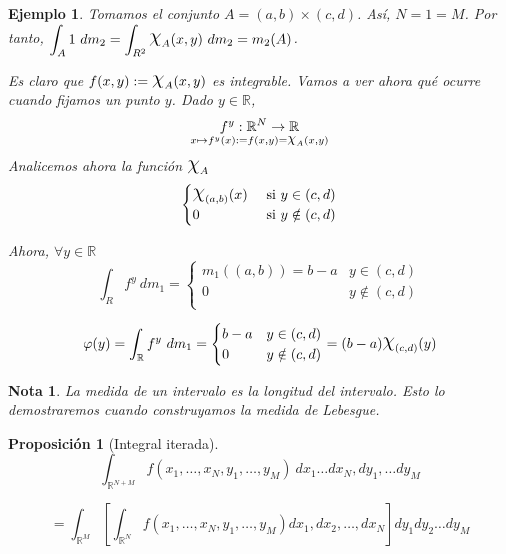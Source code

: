 \documentclass[11pt, a4paper]{article}
\newif\IfInSansMode
\newcommand{\R}{\mathbb{R}} \newcommand{\N}{\mathbb{N}}
\DeclareRobustCommand{\rchi}{{\Large \mathpalette\irchi\relax}}
\newcommand{\irchi}[2]{\raisebox{0.4\depth}{$#1\chi$}} %
\theoremstyle{theorem-style}
\newtheorem{nprop}{Proposición}[section]
\theoremstyle{definition-style}
\theoremstyle{remark-style}
\newtheorem*{nota}{Nota}
\theoremstyle{example-style}
\newtheorem{ejemplo}{Ejemplo}[section]
\begin{document}
\begin{ejemplo}
  Tomamos el conjunto $A = (a, b) \times (c, d)$. Así, $N = 1 = M$. Por tanto,
  $\displaystyle \int_A 1 \ dm_2 = \int_{R^2} \rchi_A (x, y) \ dm_2 = m_2(A)$.

  Es claro que $f(x, y) := \rchi_A(x,y)$ es integrable. Vamos a ver ahora qué
  ocurre cuando fijamos un punto $y$. Dado $y \in \R$, $$\underset{x \mapsto f^y(x)
      := f(x, y) = \rchi_A(x,y)}{f^y: \R^N \rightarrow \R}$$
  Analicemos ahora la función $\rchi_A$
  $$\begin{cases}
    \rchi_{(a,b)}(x) & \text{ si } y \in (c,d) \\
    0 & \text{ si } y \notin (c,d) \\
  \end{cases}$$

  Ahora, $\forall y \in \R$ $$\int_R f^y \ dm_1 = \begin{cases}
    m_1 ((a,b)) = b - a & y \in (c, d) \\
    0 & y \notin (c, d) \\
  \end{cases}$$

  \[\varphi(y) = \int_{\R} f^y \ dm_1 = \begin{cases}
    b - a & y \in (c, d) \\
    0 & y \notin (c, d) \\
  \end{cases} = (b -a) \rchi_{(c, d)} (y)\]
  
\end{ejemplo}

\begin{nota}
  La medida de un intervalo es la longitud del intervalo. Esto lo demostraremos cuando construyamos la medida de Lebesgue.
\end{nota}



\begin{nprop}[Integral iterada]
  $$\int_{\R^{N+M}} f(x_1, \hdots, x_N, y_1, \hdots, y_M) \ dx_1 \hdots dx_N,
  dy_1, \hdots dy_M$$

  $$= \int_{\R^M} \left[ \int_{\R^N} f(x_1, \hdots, x_N, y_1,
    \hdots, y_M) dx_1, dx_2, \hdots, dx_N \right] dy_1 dy_2 \hdots dy_M$$
\end{nprop}
\end{document}
